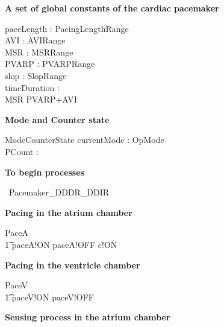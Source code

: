 \hline
\textbf{A set of global constants of the cardiac pacemaker}
\hline
\begin{axdef}
  paceLength : PacingLengthRange\\
  AVI : AVIRange \\
  MSR : MSRRange \\
  PVARP : PVARPRange \\
  slop  : SlopRange  \\
  timeDuration : \nat
  \where \\
  MSR \geq PVARP+AVI
\end{axdef}


\textbf{Mode and Counter state}

\begin{schema}{ModeCounterState}
  currentMode : OpMode\\
  PCount : \nat \\
\end{schema}


\hline
\textbf{To begin \Circus processes }
\hline


\begin{circus}
	\circprocess\ Pacemaker\_DDDR\_DDIR \circdef \circbegin
\end{circus}



\textbf {Pacing in the atrium chamber}

\begin{circusaction}
  PaceA \circdef \\
  \t1 paceA!ON \then paceA!OFF \then  c!ON \then  \Skip 
\end{circusaction}


\textbf {Pacing in the ventricle chamber}

\begin{circusaction}
  PaceV \circdef \\
  \t1 paceV!ON \then paceV!OFF \then \Skip
\end{circusaction}

\textbf {Sensing process in the atrium chamber}




